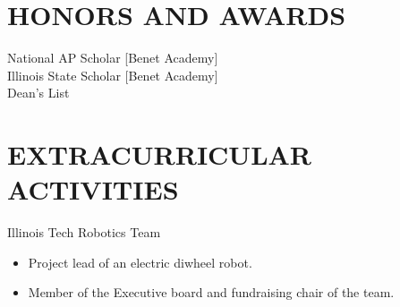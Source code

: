 \documentclass{res}
\begin{document}
\begin{resume}
 
\section{HONORS AND AWARDS}          
    National AP Scholar [Benet Academy]\\
    Illinois State Scholar [Benet Academy]\\
    Dean's List
 
\section{EXTRACURRICULAR ACTIVITIES}          
    Illinois Tech Robotics Team
    \begin{itemize}
       \item Project lead of an electric diwheel robot.
       \item Member of the Executive board and fundraising chair of the team.
    \end{itemize}
\end{resume}
\end{document}
